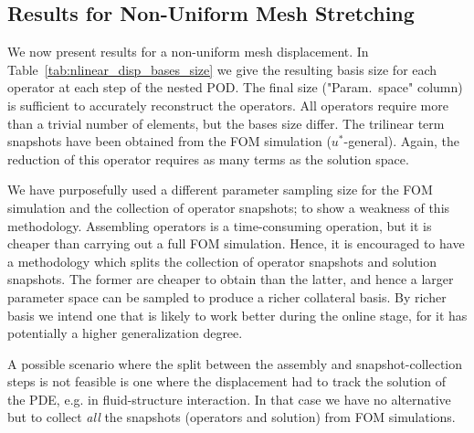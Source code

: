\documentclass[../../thesis.tex]{subfiles}
\begin{document}
\clearpage
\subsection{Results for Non-Uniform Mesh Stretching}
\label{sec:arbitrary_mesh_results}
We now present results for a non-uniform mesh displacement. 
In Table~\ref{tab:nlinear_disp_bases_size} we give the resulting basis size 
for each operator at each step of the nested POD.
The final size (\mbox{"Param. space"} column) is sufficient to accurately reconstruct the operators.
All operators require more than a trivial number of elements, 
but the bases size differ.
The trilinear term snapshots have been obtained from the FOM simulation 
($u^{*}$-general).
Again, the reduction of this operator requires as many terms as the solution space.

We have purposefully used a different parameter sampling size 
for the FOM simulation and the collection of operator snapshots;
to show a weakness of this methodology.
Assembling operators is a time-consuming operation, 
but it is cheaper than carrying out a full FOM simulation.
Hence, it is encouraged to have a methodology which splits the collection
of operator snapshots and solution snapshots.
The former are cheaper to obtain than the latter, 
and hence a larger parameter space can be sampled to produce a richer collateral basis.
By richer basis we intend one that is likely to work better during the online stage, 
for it has potentially a higher generalization degree.

A possible scenario where the split between the assembly and snapshot-collection steps
is not feasible is one where the displacement had to track the solution of the PDE,
e.g. in fluid-structure interaction.
In that case we have no alternative but to collect 
\textit{all} the snapshots (operators and solution) from FOM simulations.
\end{document}

